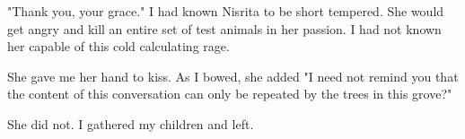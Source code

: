 \documentclass{article}
\begin{document}
"Thank you, your grace." I had known Nisrita to be short tempered. She would get angry and kill an entire set of test animals in her passion. I had not known her capable of this cold calculating rage. 

She gave me her hand to kiss. As I bowed, she added "I need not remind you that the content of this conversation can only be repeated by the trees in this grove?"

She did not. I gathered my children and left.
\end{document}
